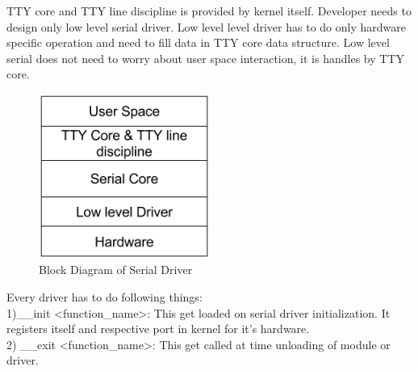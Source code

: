 \documentclass[12pt,a4paper]{article}
\begin{document}
TTY core and TTY line discipline is provided by kernel itself. Developer needs to design only low level serial driver. Low level level driver has to do only hardware specific operation and need to fill data in TTY core data structure. Low level serial does not need to worry about user space interaction, it is handles by TTY core. 
	\begin{figure}[h!]
	\centering
	\includegraphics[width=0.5\textwidth]{./figs/Serial_Driver_block.png}
	\caption{Block Diagram of Serial Driver}
	\label{fig1}
	\end{figure}
Every driver has to do following things:
\\1)\_\_init  \textless function\_name\textgreater :
This get loaded on serial driver initialization. It registers itself and respective port in kernel for it’s hardware.
\\2) \_\_exit \textless function\_name\textgreater : This get called at time unloading of module or driver.
\\
\end{document}
